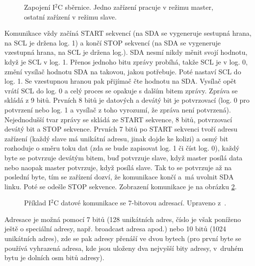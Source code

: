 \begin{figure}[H]
    \centering
    \def\svgwidth{\columnwidth}
    
    \caption[Zapojení I$^2$C sběrnice.]{Zapojení I$^2$C sběrnice. Jedno zařízení pracuje v režimu master, ostatní zařízení v režimu slave.}
    \label{fig:i2c-sbernice}
\end{figure}

Komunikace vždy začíná START sekvencí (na SDA se vygeneruje sestupná hrana, na SCL je držena log. 1) a končí STOP sekvencí (na SDA se vygeneruje vzestupná hrana, na SCL je držena log.). SDA nesmí nikdy měnit svojí hodnotu, když je SCL v log. 1.  Přenos jednoho bitu zprávy probíhá, takže SCL je v log. 0, změní vysílač hodnotu SDA na takovou, jakou potřebuje. Poté nastaví SCL do log. 1. Se vzestupnou hranou pak přijímač čte hodnotu na SDA. Vysílač opět vrátí SCL do log. 0 a celý proces se opakuje s dalším bitem zprávy. Zpráva se skládá z 9 bitů. Prvních 8 bitů je datových a devátý bit je potvrzovací (log. 0 pro potvrzení nebo log. 1 a vysílač z toho vyrozumí, že zpráva není potvrzená). Nejednodušší tvar zprávy se skládá ze START sekvence, 8 bitů, potvrzovací devátý bit a STOP sekvence. Prvních 7 bitů po START sekvenci tvoří adresu zařízení (každý slave má unikátní adresu, jinak dojde ke kolizi) a osmý bit rozhoduje o směru toku dat (zda se bude zapisovat log. 1 či číst log. 0), každý byte se potvrzuje devátým bitem, buď potvrzuje slave, když master posílá data nebo naopak master potvrzuje, když posílá slave. Tak to se potvrzuje až na poslední byte, tím se zařízení dozví, že komunikace končí a~má uvolnit SDA linku. Poté se odešle STOP sekvence. Zobrazení komunikace je na obrázku \ref{fig:i2c-sbernice-datova-komunikace-7bit-adresa}.

\begin{figure}[H]
    \centering
    \def\svgwidth{\columnwidth}
    
    \caption[Příklad I$^2$C datové komunikace se 7-bitovou adresací.]{Příklad I$^2$C datové komunikace se 7-bitovou adresací. Upraveno z~\cite{i2c-sbernice-datovy-paket-7bit-adresa}.}
    \label{fig:i2c-sbernice-datova-komunikace-7bit-adresa}
\end{figure}

Adresace je možná pomocí 7 bitů (128 unikátních adres, číslo je však poníženo ještě o speciální adresy, např. broadcast adresa apod.) nebo 10 bitů (1024 unikátních adres), zde se pak adresy přenáší ve dvou bytech (pro první byte se používá vyhrazená adresa, kde jsou uloženy dva nejvyšší bity adresy, v~druhém bytu je dolních osm bitů adresy).

